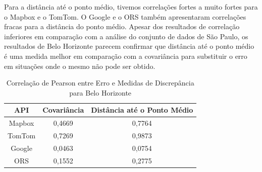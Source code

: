 Para a distância até o ponto médio, tivemos correlações fortes a muito fortes para o Mapbox e o TomTom. O Google e o ORS também apresentaram correlações fracas para a distância do ponto médio. Apesar dos resultados de correlação inferiores em comparação com a análise do conjunto de dados de São Paulo, os resultados de Belo Horizonte parecem confirmar que distância até o ponto médio é uma medida melhor em comparação com a covariância para substituir o erro em situações onde o mesmo não pode ser obtido.

\begin{table}[!ht]
    \centering
    \caption{Correlação de Pearson entre Erro e Medidas de Discrepância para Belo Horizonte}
    \label{tab:correlationBH}
    \begin{adjustbox}{width=0.7\textwidth}
    \begin{tabular}{|c|c|c|}
    \hline
    API & Covariância & Distância até o Ponto Médio \\
    \hline
    Mapbox & 0,4669 & 0,7764 \\
    TomTom & 0,7269 & 0,9873 \\
    Google & 0,0463 & 0,0754 \\
    ORS & 0,1552 & 0,2775 \\
    \hline
    \end{tabular}
    \end{adjustbox}
\end{table}





